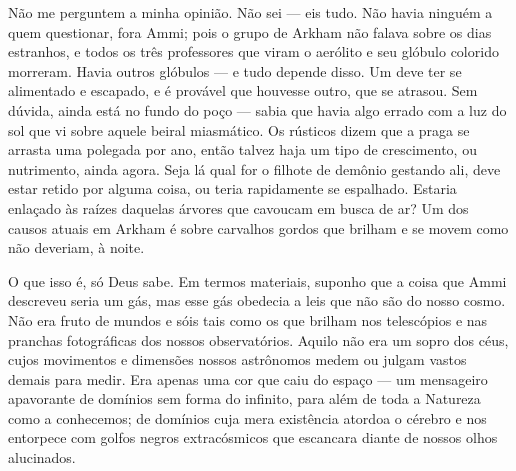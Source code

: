 
Não me perguntem a minha opinião. Não sei --- eis tudo. Não havia
ninguém a quem questionar, fora Ammi; pois o grupo de Arkham não falava
sobre os dias estranhos, e todos os três professores que viram o
aerólito e seu glóbulo colorido morreram. Havia outros glóbulos --- e
tudo depende disso. Um deve ter se alimentado e escapado, e é provável
que houvesse outro, que se atrasou. Sem dúvida, ainda está no fundo do
poço --- sabia que havia algo
errado com a luz do sol que vi sobre aquele beiral miasmático. Os
rústicos dizem que a praga se arrasta uma polegada por ano, então talvez
haja um tipo de crescimento, ou nutrimento, ainda agora. Seja lá qual
for o filhote de demônio gestando ali, deve estar retido por alguma
coisa, ou teria rapidamente se espalhado. Estaria enlaçado às raízes
daquelas árvores que cavoucam em busca de ar? Um dos causos atuais em
Arkham é sobre carvalhos gordos que brilham e se movem como não
deveriam, à noite.

O que isso é, só Deus sabe. Em termos materiais, suponho que a coisa que
Ammi descreveu seria um gás, mas esse gás obedecia a leis que não são do
nosso cosmo. Não era fruto de mundos e sóis tais como os que brilham nos
telescópios e nas pranchas fotográficas dos nossos observatórios. Aquilo
não era um sopro dos céus, cujos movimentos e dimensões nossos
astrônomos medem ou julgam vastos demais para medir. Era apenas uma cor
que caiu do espaço --- um
mensageiro apavorante de domínios sem forma do infinito, para além de
toda a Natureza como a conhecemos; de domínios cuja mera existência
atordoa o cérebro e nos entorpece com golfos negros extracósmicos que
escancara diante de nossos olhos alucinados.

